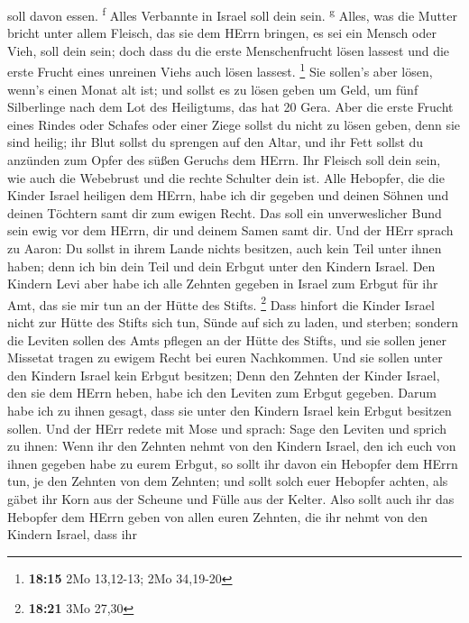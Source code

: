 soll davon essen. \textsuperscript{f}  Alles Verbannte in
Israel soll dein sein. \textsuperscript{g}  Alles, was
die Mutter bricht unter allem Fleisch, das sie dem HErrn bringen, es sei
ein Mensch oder Vieh, soll dein sein; doch dass du die erste
Menschenfrucht lösen lassest und die erste Frucht eines unreinen Viehs
auch lösen lassest. \footnote{\textbf{18:15} 2Mo 13,12-13; 2Mo 34,19-20}
 Sie sollen's aber lösen, wenn's einen Monat alt ist; und
sollst es zu lösen geben um Geld, um fünf Silberlinge nach dem Lot des
Heiligtums, das hat 20 Gera.  Aber die erste Frucht eines
Rindes oder Schafes oder einer Ziege sollst du nicht zu lösen geben,
denn sie sind heilig; ihr Blut sollst du sprengen auf den Altar, und ihr
Fett sollst du anzünden zum Opfer des süßen Geruchs dem HErrn.
 Ihr Fleisch soll dein sein, wie auch die Webebrust und
die rechte Schulter dein ist.  Alle Hebopfer, die die
Kinder Israel heiligen dem HErrn, habe ich dir gegeben und deinen Söhnen
und deinen Töchtern samt dir zum ewigen Recht. Das soll ein
unverweslicher Bund sein ewig vor dem HErrn, dir und deinem Samen samt
dir.  Und der HErr sprach zu Aaron: Du sollst in ihrem
Lande nichts besitzen, auch kein Teil unter ihnen haben; denn ich bin
dein Teil und dein Erbgut unter den Kindern Israel.  Den
Kindern Levi aber habe ich alle Zehnten gegeben in Israel zum Erbgut für
ihr Amt, das sie mir tun an der Hütte des Stifts. \footnote{\textbf{18:21}
  3Mo 27,30}  Dass hinfort die Kinder Israel nicht zur
Hütte des Stifts sich tun, Sünde auf sich zu laden, und sterben;
 sondern die Leviten sollen des Amts pflegen an der Hütte
des Stifts, und sie sollen jener Missetat tragen zu ewigem Recht bei
euren Nachkommen. Und sie sollen unter den Kindern Israel kein Erbgut
besitzen;  Denn den Zehnten der Kinder Israel, den sie
dem HErrn heben, habe ich den Leviten zum Erbgut gegeben. Darum habe ich
zu ihnen gesagt, dass sie unter den Kindern Israel kein Erbgut besitzen
sollen.  Und der HErr redete mit Mose und sprach:
 Sage den Leviten und sprich zu ihnen: Wenn ihr den
Zehnten nehmt von den Kindern Israel, den ich euch von ihnen gegeben
habe zu eurem Erbgut, so sollt ihr davon ein Hebopfer dem HErrn tun, je
den Zehnten von dem Zehnten;  und sollt solch euer
Hebopfer achten, als gäbet ihr Korn aus der Scheune und Fülle aus der
Kelter.  Also sollt auch ihr das Hebopfer dem HErrn geben
von allen euren Zehnten, die ihr nehmt von den Kindern Israel, dass ihr
